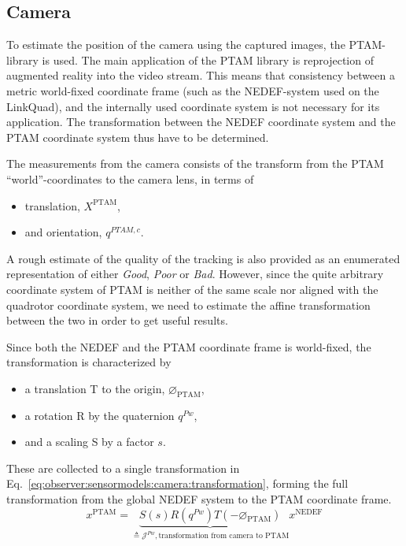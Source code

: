 \subsection{Camera}
\label{ssec:observer:sensormodels:camera}
    To estimate the position of the camera using the captured images,
    the PTAM-library is used.
    The main application of the PTAM library is reprojection of
    augmented reality into the video stream.
    This means that consistency between a metric world-fixed
    coordinate frame (such as the NEDEF-system used on the LinkQuad), and the
    internally used coordinate system is not necessary for its application.
    The transformation between the NEDEF coordinate system and the
    PTAM coordinate system thus have to be determined.

    The measurements from the camera consists of the transform from the PTAM ``world''-coordinates
    to the camera lens, in terms of
    \begin{itemize}
        \item translation, $X^{\text{PTAM}}$,
        \item and orientation, $q^{PTAM,c}$.
    \end{itemize}
    A rough estimate of the quality of the tracking is also provided as an enumerated representation of either \textit{Good}, \textit{Poor} or \textit{Bad}.
    However, since the quite arbitrary \citep{klein07parallel} coordinate system
    of PTAM is neither of the same scale nor aligned with the quadrotor coordinate system,
    we need to estimate the affine transformation between the two in order to get useful results.

    Since both the NEDEF and the PTAM coordinate frame is world-fixed, the transformation is characterized by
    \begin{itemize}
        \item a translation T to the origin, $\varnothing_{\text{PTAM}}$,
        \item a rotation R by the quaternion $q^{Pw}$,
        \item and a scaling S by a factor $s$.
    \end{itemize}
    These are collected to a single transformation in Eq.~\ref{eq:observer:sensormodels:camera:transformation},
    forming the full transformation from the global NEDEF system to the
    PTAM coordinate frame.
    \begin{equation}
        \label{eq:observer:sensormodels:camera:transformation}
        x^{\text{PTAM}} = \underbrace{S(s) R(q^{Pw}) T(-\varnothing_{\text{PTAM}})}_{\triangleq \mathcal{J}^{Pw}, \text{transformation from camera to PTAM}}
         x^{\text{NEDEF}}
    \end{equation}

